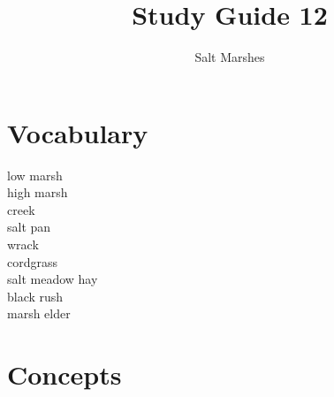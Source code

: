 \documentclass[nofonts, letterpaper]{tufte-handout}
\title{Study Guide 12}
\author{Salt Marshes}
\date{} %
\begin{document}
\maketitle	%


\section{Vocabulary}
\vspace{-1\baselineskip}
\begin{multicols}{2}
low marsh \\
high marsh \\
creek \\
salt pan \\
wrack \\
cordgrass \\
salt meadow hay \\
black rush \\
marsh elder
\end{multicols}

\section{Concepts}
\end{document}

